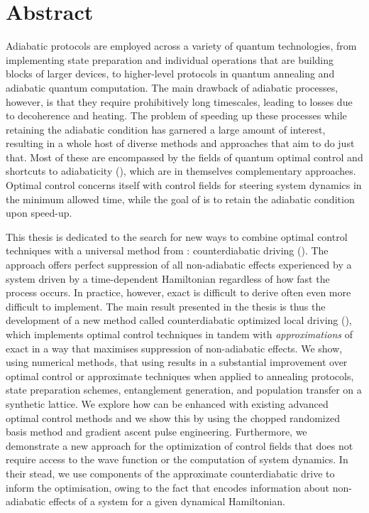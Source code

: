 \chapter{Abstract}\label{chap:abstract}

Adiabatic protocols are employed across a variety of quantum technologies, from implementing state preparation and individual operations that are building blocks of larger devices, to higher-level protocols in quantum annealing and adiabatic quantum computation. The main drawback of adiabatic processes, however, is that they require prohibitively long timescales, leading to losses due to decoherence and heating. The problem of speeding up these processes while retaining the adiabatic condition has garnered a large amount of interest, resulting in a whole host of diverse methods and approaches that aim to do just that. Most of these are encompassed by the fields of quantum optimal control and shortcuts to adiabaticity (), which are in themselves complementary approaches. Optimal control concerns itself with control fields for steering system dynamics in the minimum allowed time, while the goal of  is to retain the adiabatic condition upon speed-up.

This thesis is dedicated to the search for new ways to combine optimal control techniques with a universal method from : counterdiabatic driving (). The  approach offers perfect suppression of all non-adiabatic effects experienced by a system driven by a time-dependent Hamiltonian regardless of how fast the process occurs. In practice, however, exact  is difficult to derive often even more difficult to implement. The main result presented in the thesis is thus the development of a new method called counterdiabatic optimized local driving (), which implements optimal control techniques in tandem with \emph{approximations} of exact  in a way that maximises suppression of non-adiabatic effects. We show, using numerical methods, that using  results in a substantial improvement over optimal control or approximate  techniques when applied to annealing protocols, state preparation schemes, entanglement generation, and population transfer on a synthetic lattice. We explore how  can be enhanced with existing advanced optimal control methods and we show this by using the chopped randomized basis method and gradient ascent pulse engineering. Furthermore, we demonstrate a new approach for the optimization of control fields that does not require access to the wave function or the computation of system dynamics. In their stead, we use components of the approximate counterdiabatic drive to inform the optimisation, owing to the fact that  encodes information about non-adiabatic effects of a system for a given dynamical Hamiltonian. 